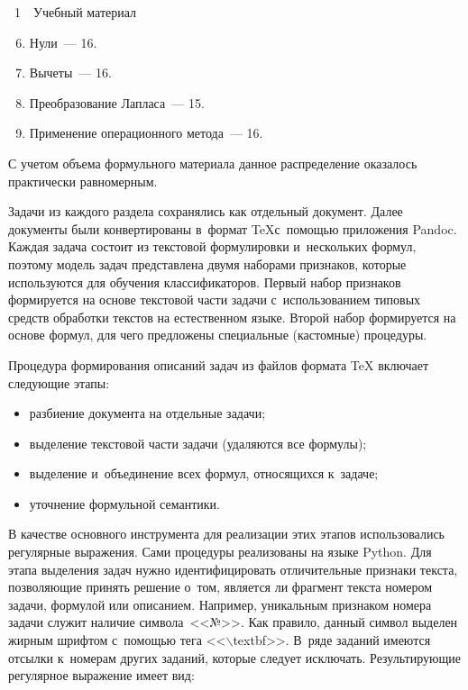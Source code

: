 \begin{multicols}{2}
{\begin{center}
\noindent
{{\figurename~1}\ \ \small{Учебный материал
}}
\end{center}
}


\addtocounter{figure}{1}



\begin{enumerate}[1.]
\setcounter{enumi}{5}
\item Нули~--- 16. 
\item Вычеты~--- 16. 
\item Преобразование Лапласа~--- 15. 
\item Применение операционного метода~--- 16.
\end{enumerate}
      С учетом объема формульного материала данное распределение 
оказалось практически равномерным. 
      
      Задачи из каждого раздела сохранялись как отдельный документ. 
Далее документы были конвертированы в~формат \TeX с~по\-мощью 
приложения Pandoc. Каждая задача со\-сто\-ит из текс\-то\-вой формулировки 
и~нескольких формул, поэтому модель задач пред\-став\-ле\-на двумя наборами 
признаков, которые используются для обуче\-ния классификаторов. Первый 
набор при\-зна\-ков формируется на основе текс\-то\-вой час\-ти задачи 
с~использованием типовых средств обработки текс\-тов на естественном 
языке. Второй набор формируется на основе формул, для чего предложены 
специальные (кас\-том\-ные) процедуры.
      


      Процедура формирования описаний задач из файлов формата TeX 
включает сле\-ду\-ющие этапы:
      \begin{itemize}
\item разбиение документа на отдельные задачи;
\item выделение текстовой час\-ти задачи (удаляются все формулы);
\item выделение и~объединение всех формул, относящихся к~задаче;
\item уточнение формульной семантики.
\end{itemize}

      В качестве основного инструмента для реализации этих этапов 
использовались регулярные выражения. Сами процедуры реализованы на 
языке Python. Для этапа выделения задач нуж\-но идентифицировать 
отличительные признаки текс\-та, поз\-во\-ля\-ющие принять решение о~том, 
является ли фрагмент текс\-та номером задачи, формулой или описанием. 
Например, уникальным признаком номера задачи служит наличие символа~<<№>>. 
Как правило, данный сим\-вол выделен жир\-ным шриф\-том с~по\-мощью 
тега <<$\backslash$textbf>>. В~ряде заданий име\-ют\-ся отсылки к~номерам других 
заданий, которые следует исключать. Ре\-зуль\-ти\-ру\-ющие регулярное 
выражение имеет вид: 


\end{multicols}

